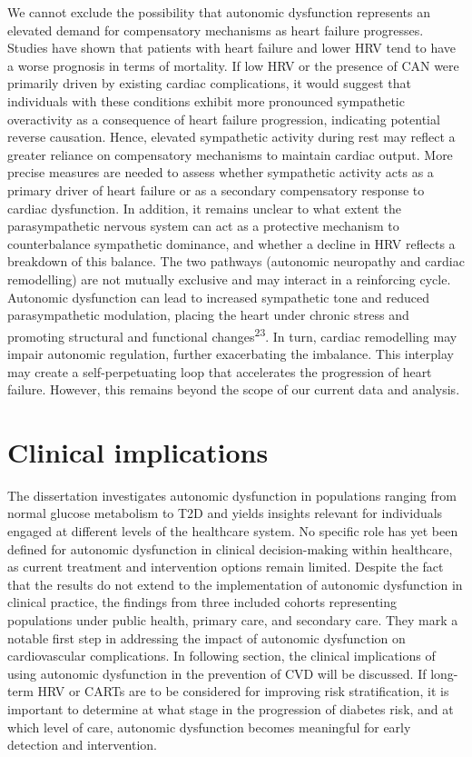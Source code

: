 \documentclass[
  a4paper,
  headsepline=true,
  open=any]{scrbook}
\begin{document}
We cannot exclude the possibility that autonomic dysfunction represents
an elevated demand for compensatory mechanisms as heart failure
progresses. Studies have shown that patients with heart failure and
lower HRV tend to have a worse prognosis in terms of mortality. If low
HRV or the presence of CAN were primarily driven by existing cardiac
complications, it would suggest that individuals with these conditions
exhibit more pronounced sympathetic overactivity as a consequence of
heart failure progression, indicating potential reverse causation.
Hence, elevated sympathetic activity during rest may reflect a greater
reliance on compensatory mechanisms to maintain cardiac output. More
precise measures are needed to assess whether sympathetic activity acts
as a primary driver of heart failure or as a secondary compensatory
response to cardiac dysfunction. In addition, it remains unclear to what
extent the parasympathetic nervous system can act as a protective
mechanism to counterbalance sympathetic dominance, and whether a decline
in HRV reflects a breakdown of this balance. The two pathways (autonomic
neuropathy and cardiac remodelling) are not mutually exclusive and may
interact in a reinforcing cycle. Autonomic dysfunction can lead to
increased sympathetic tone and reduced parasympathetic modulation,
placing the heart under chronic stress and promoting structural and
functional changes\textsuperscript{23}. In turn, cardiac remodelling may
impair autonomic regulation, further exacerbating the imbalance. This
interplay may create a self-perpetuating loop that accelerates the
progression of heart failure. However, this remains beyond the scope of
our current data and analysis.

\hypertarget{clinical-implications}{%
\section{Clinical implications}\label{clinical-implications}}

The dissertation investigates autonomic dysfunction in populations
ranging from normal glucose metabolism to T2D and yields insights
relevant for individuals engaged at different levels of the healthcare
system. No specific role has yet been defined for autonomic dysfunction
in clinical decision-making within healthcare, as current treatment and
intervention options remain limited. Despite the fact that the results
do not extend to the implementation of autonomic dysfunction in clinical
practice, the findings from three included cohorts representing
populations under public health, primary care, and secondary care. They
mark a notable first step in addressing the impact of autonomic
dysfunction on cardiovascular complications. In following section, the
clinical implications of using autonomic dysfunction in the prevention
of CVD will be discussed. If long-term HRV or CARTs are to be considered
for improving risk stratification, it is important to determine at what
stage in the progression of diabetes risk, and at which level of care,
autonomic dysfunction becomes meaningful for early detection and
intervention.
\end{document}
